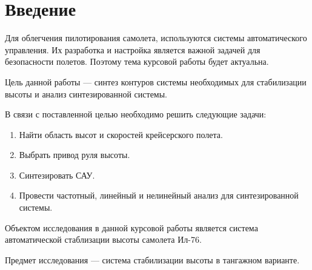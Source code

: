 \chapter*{\centering Введение} 

Для облегчения пилотирования самолета, используются системы автоматического управления.
Их разработка и настройка является важной задачей для безопасности полетов. Поэтому тема курсовой работы будет актуальна. 

Цель данной работы --- синтез контуров системы необходимых для стабилизации высоты и анализ синтезированной системы.

В связи с поставленной целью необходимо решить следующие задачи: 
\begin{enumerate}
    \item Найти область высот и скоростей крейсерского полета.
    \item Выбрать привод руля высоты.
    \item Синтезировать САУ.
    \item Провести частотный, линейный и нелинейный анализ для синтезированной системы.
\end{enumerate}

Объектом исследования в данной курсовой работы является система автоматической стаблизации высоты самолета Ил-76.

Предмет исследования --- система стабилизации высоты в тангажном варианте. 

